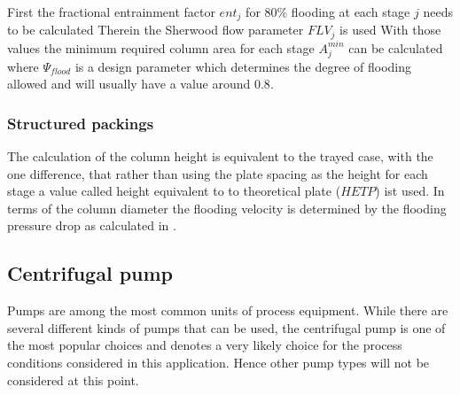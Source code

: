         First the fractional entrainment factor $ent_j$ for 80\% flooding at each stage $j$ needs to be calculated
        Therein the Sherwood flow parameter $FLV_j$ is used
        With those values the minimum required column area for each stage $A_j^{min}$ can be calculated
        where $\Psi_{flood}$ is a design parameter which determines the degree of flooding allowed and will usually
        have a value around $0.8$.

    \subsubsection{Structured packings}
        The calculation of the column height is equivalent to the trayed case, with the one difference, that
        rather than using the plate spacing as the height for each stage a value called height equivalent
        to to theoretical plate ($HETP$) ist used. In terms of the column diameter the flooding velocity
        is determined by the flooding pressure drop as calculated in .

\subsection{Centrifugal pump}
		Pumps are among the most common units of process equipment. While there are several different
		kinds of pumps that can be used, the centrifugal pump is one of the most popular choices and
		denotes a very likely choice for the process conditions considered in this application. Hence
		other pump types will not be considered at this point.
		
